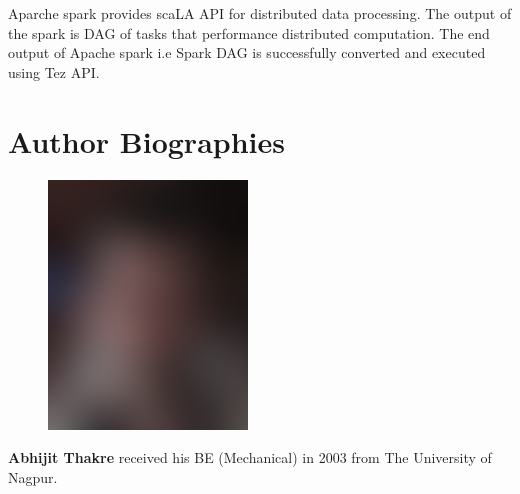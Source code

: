 \documentclass[9pt,twocolumn,twoside]{styles/osajnl}
\begin{document}
  Aparche spark provides scaLA API for distributed data processing. The output of the spark is DAG of tasks that performance distributed computation. The end output of Apache spark i.e Spark DAG is successfully converted and executed using Tez API.

 \newpage



 
\section*{Author Biographies}
\begingroup
\setlength\intextsep{0pt}
\begin{minipage}[t][3.2cm][t]{1.0\columnwidth} %
  \begin{figure}
    \includegraphics[width=0.25\columnwidth]{images/john_smith.eps}
  \end{figure}
  \noindent
  {\bfseries Abhijit Thakre} received his BE (Mechanical) in 2003 from
  The University of Nagpur.
\end{minipage}
\endgroup


\appendix
\end{document}
